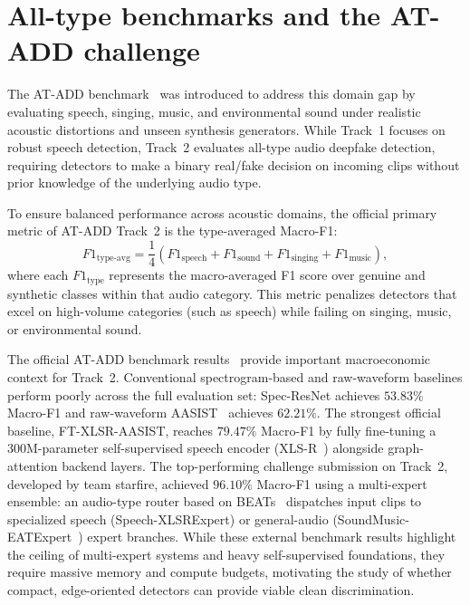 \section{All-type benchmarks and the AT-ADD challenge}

The AT-ADD benchmark~\cite{xie2026atadd} was introduced to address this domain gap by evaluating speech, singing, music, and environmental sound under realistic acoustic distortions and unseen synthesis generators. While Track~1 focuses on robust speech detection, Track~2 evaluates all-type audio deepfake detection, requiring detectors to make a binary real/fake decision on incoming clips without prior knowledge of the underlying audio type.

To ensure balanced performance across acoustic domains, the official primary metric of AT-ADD Track~2 is the type-averaged Macro-F1:
\begin{equation}
F1_{\mathrm{type\text{-}avg}} = \frac{1}{4}\left(F1_{\mathrm{speech}} + F1_{\mathrm{sound}} + F1_{\mathrm{singing}} + F1_{\mathrm{music}}\right),
\end{equation}
where each $F1_{\mathrm{type}}$ represents the macro-averaged F1 score over genuine and synthetic classes within that audio category. This metric penalizes detectors that excel on high-volume categories (such as speech) while failing on singing, music, or environmental sound.

The official AT-ADD benchmark results~\cite{xie2026atadd} provide important macroeconomic context for Track~2. Conventional spectrogram-based and raw-waveform baselines perform poorly across the full evaluation set: Spec-ResNet achieves $53.83\%$ Macro-F1 and raw-waveform AASIST~\cite{jung2022aasist} achieves $62.21\%$. The strongest official baseline, FT-XLSR-AASIST, reaches $79.47\%$ Macro-F1 by fully fine-tuning a 300M-parameter self-supervised speech encoder (XLS-R~\cite{babu2021xlsr}) alongside graph-attention backend layers. The top-performing challenge submission on Track~2, developed by team starfire, achieved $96.10\%$ Macro-F1 using a multi-expert ensemble: an audio-type router based on BEATs~\cite{chen2022beats} dispatches input clips to specialized speech (Speech-XLSRExpert) or general-audio (SoundMusic-EATExpert~\cite{chen2024eat}) expert branches. While these external benchmark results highlight the ceiling of multi-expert systems and heavy self-supervised foundations, they require massive memory and compute budgets, motivating the study of whether compact, edge-oriented detectors can provide viable clean discrimination.

